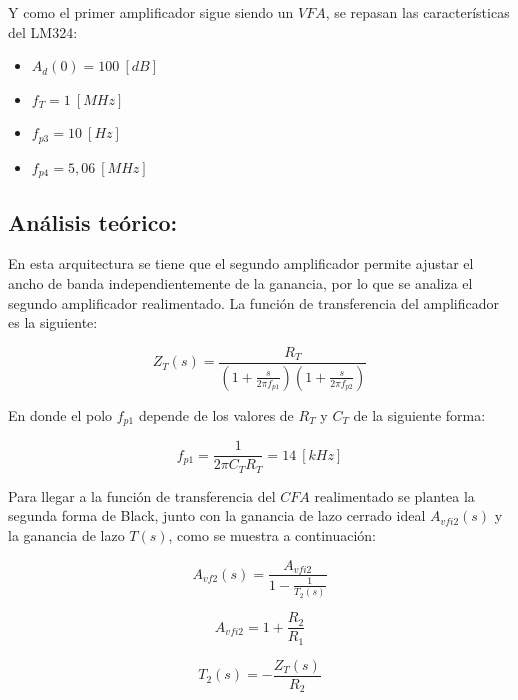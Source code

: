\documentclass[12pt,a4paper]{article}
\begin{document}
Y como el primer amplificador sigue siendo un $VFA$, se repasan las características del LM324:

\begin{itemize}
    \item $A_d(0) = 100~[dB]$
    \item $f_T = 1~[MHz]$
    \item $f_{p3} = 10~[Hz]$        
    \item $f_{p4} = 5,06~[MHz]$
\end{itemize}
\hspace{0.5 cm}

\subsection{Análisis teórico:}

En esta arquitectura se tiene que el segundo amplificador permite ajustar el ancho de banda independientemente de la ganancia, por lo que se analiza el segundo amplificador realimentado. La función de transferencia del amplificador es la siguiente:

   \begin{equation}
        \label{eq_59}
Z_T(s) = \frac{R_T}{\left(1+\frac{s}{2\pi f_{p1}}\right)\left(1+\frac{s}{2\pi f_{p2}}\right)}
\end{equation}
    \hspace{0.5 cm}

En donde el polo $f_{p1}$ depende de los valores de $R_T$ y $C_T$ de la siguiente forma:

   \begin{equation}
        \label{eq_60}
f_{p1} = \frac{1}{2\pi C_TR_T} = 14~[kHz]
\end{equation}
    \hspace{0.5 cm}

Para llegar a la función de transferencia del $CFA$ realimentado se plantea la segunda forma de Black, junto con la ganancia de lazo cerrado ideal $A_{vfi2}(s)$ y la ganancia de lazo $T(s)$, como se muestra a continuación:

   \begin{equation}
        \label{eq_61}
A_{vf2}(s) = \frac{A_{vfi2}}{1-\frac{1}{T_2(s)}}
\end{equation}

   \begin{equation}
        \label{eq_62}
A_{vfi2} = 1+\frac{R_2}{R_1}
\end{equation}

       \begin{equation}
        \label{eq_63}
T_2(s) = -\frac{Z_T(s)}{R_2}
\end{equation}
\hspace{0.5 cm}
\end{document}
